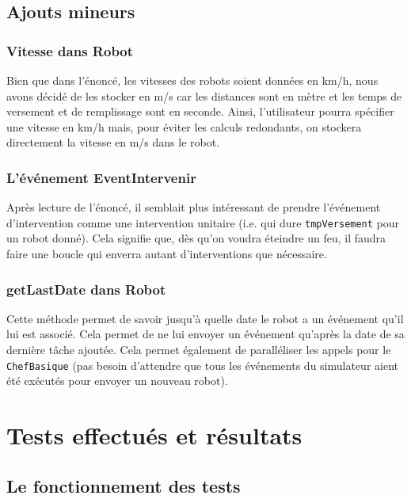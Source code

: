 \documentclass[a4paper,8pt]{article} %
\begin{document}
\subsection{Ajouts mineurs}
\subsubsection{Vitesse dans Robot}
Bien que dans l'énoncé, les vitesses des robots soient données en km/h, nous avons décidé de les stocker en m/s
car les distances sont en mètre et les temps de versement et de remplissage sont en seconde. Ainsi, l'utilisateur pourra spécifier une 
vitesse en km/h mais, pour éviter les calculs redondants, on stockera directement la vitesse en m/s dans le robot.
\subsubsection{L'événement EventIntervenir}
Après lecture de l'énoncé, il semblait plus intéressant de prendre l'événement d'intervention comme une intervention unitaire
(i.e. qui dure \texttt{tmpVersement} pour un robot donné). Cela signifie que, dès qu'on voudra éteindre un feu, il faudra faire une 
boucle qui enverra autant d'interventions que nécessaire.
\subsubsection{getLastDate dans Robot}
Cette méthode permet de savoir jusqu'à quelle date le robot a un événement qu'il lui est associé. Cela permet de ne lui envoyer un événement
qu'après la date de sa dernière tâche ajoutée. Cela permet également de paralléliser les appels pour le \texttt{ChefBasique} 
(pas besoin d'attendre que tous les événements du simulateur aient été exécutés pour envoyer un nouveau robot).

\section{Tests effectués et résultats}
\subsection{Le fonctionnement des tests}
\end{document}
